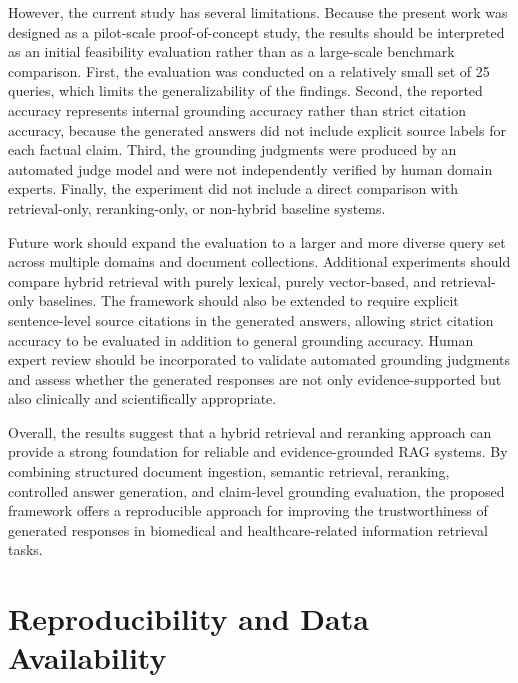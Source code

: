 However, the current study has several limitations. Because the present work was designed as a pilot-scale proof-of-concept study, the results should be interpreted as an initial feasibility evaluation rather than as a large-scale benchmark comparison. First, the evaluation was conducted on a relatively small set of 25 queries, which limits the generalizability of the findings. Second, the reported accuracy represents internal grounding accuracy rather than strict citation accuracy, because the generated answers did not include explicit source labels for each factual claim. Third, the grounding judgments were produced by an automated judge model and were not independently verified by human domain experts. Finally, the experiment did not include a direct comparison with retrieval-only, reranking-only, or non-hybrid baseline systems.

Future work should expand the evaluation to a larger and more diverse query set across multiple domains and document collections. Additional experiments should compare hybrid retrieval with purely lexical, purely vector-based, and retrieval-only baselines. The framework should also be extended to require explicit sentence-level source citations in the generated answers, allowing strict citation accuracy to be evaluated in addition to general grounding accuracy. Human expert review should be incorporated to validate automated grounding judgments and assess whether the generated responses are not only evidence-supported but also clinically and scientifically appropriate.

Overall, the results suggest that a hybrid retrieval and reranking approach can provide a strong foundation for reliable and evidence-grounded RAG systems. By combining structured document ingestion, semantic retrieval, reranking, controlled answer generation, and claim-level grounding evaluation, the proposed framework offers a reproducible approach for improving the trustworthiness of generated responses in biomedical and healthcare-related information retrieval tasks.

\section*{Reproducibility and Data Availability}

